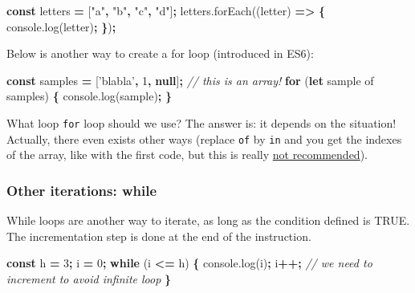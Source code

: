 \documentclass[]{book}
\newenvironment{Shaded}{\begin{snugshade}}{\end{snugshade}}
\newcommand{\AttributeTok}[1]{\textcolor[rgb]{0.77,0.63,0.00}{#1}}
\newcommand{\CommentTok}[1]{\textcolor[rgb]{0.56,0.35,0.01}{\textit{#1}}}
\newcommand{\ControlFlowTok}[1]{\textcolor[rgb]{0.13,0.29,0.53}{\textbf{#1}}}
\newcommand{\DecValTok}[1]{\textcolor[rgb]{0.00,0.00,0.81}{#1}}
\newcommand{\KeywordTok}[1]{\textcolor[rgb]{0.13,0.29,0.53}{\textbf{#1}}}
\newcommand{\NormalTok}[1]{#1}
\newcommand{\OperatorTok}[1]{\textcolor[rgb]{0.81,0.36,0.00}{\textbf{#1}}}
\newcommand{\StringTok}[1]{\textcolor[rgb]{0.31,0.60,0.02}{#1}}
\newcommand{\VariableTok}[1]{\textcolor[rgb]{0.00,0.00,0.00}{#1}}
\begin{document}
\begin{Shaded}
\begin{Highlighting}[]
\KeywordTok{const}\NormalTok{ letters }\OperatorTok{=}\NormalTok{ [}\StringTok{"a"}\OperatorTok{,} \StringTok{"b"}\OperatorTok{,} \StringTok{"c"}\OperatorTok{,} \StringTok{"d"}\NormalTok{]}\OperatorTok{;}
\VariableTok{letters}\NormalTok{.}\AttributeTok{forEach}\NormalTok{((letter) }\OperatorTok{=>} \OperatorTok{\{}
  \VariableTok{console}\NormalTok{.}\AttributeTok{log}\NormalTok{(letter)}\OperatorTok{;}
\OperatorTok{\}}\NormalTok{)}\OperatorTok{;}
\end{Highlighting}
\end{Shaded}

Below is another way to create a for loop (introduced in ES6):

\begin{Shaded}
\begin{Highlighting}[]
\KeywordTok{const}\NormalTok{ samples }\OperatorTok{=}\NormalTok{ [}\StringTok{'blabla'}\OperatorTok{,} \DecValTok{1}\OperatorTok{,} \KeywordTok{null}\NormalTok{]}\OperatorTok{;} \CommentTok{// this is an array!}
\ControlFlowTok{for}\NormalTok{ (}\KeywordTok{let}\NormalTok{ sample of samples) }\OperatorTok{\{}
 \VariableTok{console}\NormalTok{.}\AttributeTok{log}\NormalTok{(sample)}\OperatorTok{;}
\OperatorTok{\}}
\end{Highlighting}
\end{Shaded}

What loop \texttt{for} loop should we use? The answer is: it depends on the situation! Actually, there even exists other ways (replace \texttt{of} by \texttt{in} and you get the indexes of the array, like with the first code, but this is really \href{https://hacks.mozilla.org/2015/04/es6-in-depth-iterators-and-the-for-of-loop/}{not recommended}).

\hypertarget{other-iterations-while}{%
\subsubsection{Other iterations: while}\label{other-iterations-while}}

While loops are another way to iterate, as long as the condition defined is TRUE. The incrementation step is done at the end of the instruction.

\begin{Shaded}
\begin{Highlighting}[]
\KeywordTok{const}\NormalTok{ h }\OperatorTok{=} \DecValTok{3}\OperatorTok{;}\NormalTok{ i }\OperatorTok{=} \DecValTok{0}\OperatorTok{;}
\ControlFlowTok{while}\NormalTok{ (i }\OperatorTok{<=}\NormalTok{ h) }\OperatorTok{\{}
  \VariableTok{console}\NormalTok{.}\AttributeTok{log}\NormalTok{(i)}\OperatorTok{;}
\NormalTok{  i}\OperatorTok{++;} \CommentTok{// we need to increment to avoid infinite loop}
\OperatorTok{\}}
\end{Highlighting}
\end{Shaded}
\end{document}
